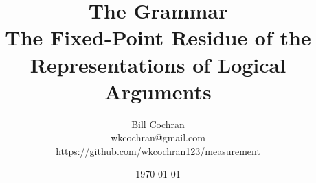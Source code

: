 \documentclass[12pt,oneside]{book}
\begin{document}
\title{The Grammar\\
\large The Fixed-Point Residue of the Representations of Logical Arguments}

\author{Bill Cochran\\wkcochran@gmail.com\\https://github.com/wkcochran123/measurement}
\date{\today}

\maketitle

\tableofcontents










\end{document}
